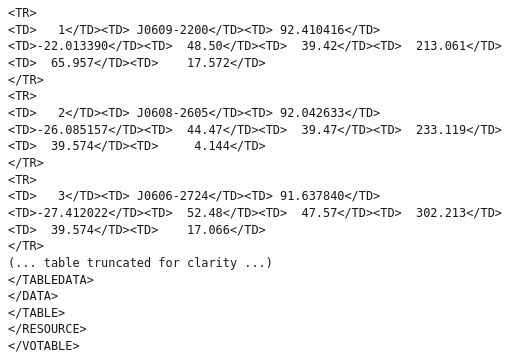 \begin{landscape}
{\begin{verbatim}
<TR>
<TD>   1</TD><TD> J0609-2200</TD><TD> 92.410416</TD><TD>-22.013390</TD><TD>  48.50</TD><TD>  39.42</TD><TD>  213.061</TD><TD>  65.957</TD><TD>    17.572</TD>
</TR>
<TR>
<TD>   2</TD><TD> J0608-2605</TD><TD> 92.042633</TD><TD>-26.085157</TD><TD>  44.47</TD><TD>  39.47</TD><TD>  233.119</TD><TD>  39.574</TD><TD>     4.144</TD>
</TR>
<TR>
<TD>   3</TD><TD> J0606-2724</TD><TD> 91.637840</TD><TD>-27.412022</TD><TD>  52.48</TD><TD>  47.57</TD><TD>  302.213</TD><TD>  39.574</TD><TD>    17.066</TD>
</TR>
(... table truncated for clarity ...)
</TABLEDATA>
</DATA>
</TABLE>
</RESOURCE>
</VOTABLE>
  \end{verbatim}
}
\end{landscape}
